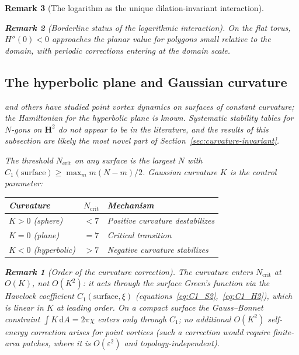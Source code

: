 \documentclass[12pt, a4paper]{article}
\newtheorem{remark}{Remark}[section]
\numberwithin{equation}{section}
\begin{document}
\begin{remark}[The logarithm as the unique dilation-invariant interaction]
\begin{remark}[Borderline status of the logarithmic interaction]
On the flat torus, $H''(0) < 0$ approaches the planar value for
polygons small relative to the domain, with periodic corrections
entering at the domain scale.

\subsection{The hyperbolic plane and Gaussian curvature}
\label{sec:hyperbolic}

\citet{Kimura1999} and others have studied point vortex dynamics on
surfaces of constant curvature; the Hamiltonian for the hyperbolic plane
is known.  Systematic stability tables for $N$-gons on $\mathbf{H}^2$
do not appear to be in the literature, and the results of this subsection
are likely the most novel part of Section~\ref{sec:curvature-invariant}.

The threshold $N_{\mathrm{crit}}$ on any surface is the largest $N$
with $C_1(\text{surface}) \ge \max_m m(N{-}m)/2$.
Gaussian curvature $K$ is the control parameter:
\begin{center}
\begin{tabular}{lcl}
\toprule
Curvature & $N_{\mathrm{crit}}$ & Mechanism \\
\midrule
$K > 0$ (sphere) & $< 7$ & Positive curvature destabilizes \\
$K = 0$ (plane) & $= 7$ & Critical transition \\
$K < 0$ (hyperbolic) & $> 7$ & Negative curvature stabilizes \\
\bottomrule
\end{tabular}
\end{center}
\begin{remark}[Order of the curvature correction]
\label{rem:euler}
The curvature enters $N_{\mathrm{crit}}$ at $O(K)$, not $O(K^2)$:
it acts through the surface Green's function via the Havelock
coefficient $C_1(\text{surface},\xi)$
(equations~\eqref{eq:C1_S2},~\eqref{eq:C1_H2}), which is linear
in $K$ at leading order.  On a compact surface the Gauss--Bonnet
constraint $\int K\,\mathrm{d}A = 2\pi\chi$ enters only through
$C_1$; no additional $O(K^2)$ self-energy correction arises for
point vortices (such a correction would require finite-area patches,
where it is $O(\varepsilon^2)$ and topology-independent).
\end{remark}


\end{remark}
\end{remark}
\end{document}
